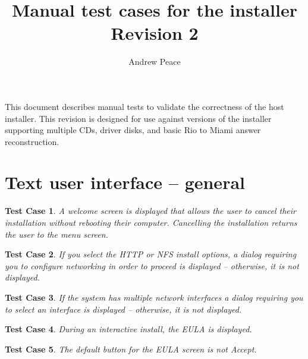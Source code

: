 \documentclass[a4paper]{article}
\newtheorem{testcase}{Test Case}
\begin{document}
\title{Manual test cases for the installer \\  Revision 2}
\author{Andrew Peace}
\date{}

\maketitle

This document describes manual tests to validate the correctness of
the host installer.  This revision is designed for use against
versions of the installer supporting multiple CDs, driver disks, and
basic Rio to Miami answer reconstruction.

\section{Text user interface -- general}

\begin{testcase}
A welcome screen is displayed that allows the user to cancel their
installation without rebooting their computer.  Cancelling the
installation returns the user to the menu screen.
\end{testcase}

\begin{testcase}
If you select the HTTP or NFS install options, a dialog requiring you
to configure networking in order to proceed is displayed -- otherwise,
it is not displayed.
\end{testcase}

\begin{testcase}
If the system has multiple network interfaces a dialog requiring you
to select an interface is displayed -- otherwise, it is not displayed.
\end{testcase}

\begin{testcase}
During an interactive install, the EULA is displayed.
\end{testcase}

\begin{testcase}
The default button for the EULA screen is not Accept.
\end{testcase}
\end{document}
